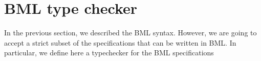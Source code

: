 \section{BML type checker}
In the previous section, we described the BML syntax.
However, we are going to accept a strict subset of 
the specifications that can be written in BML.
In particular, we define here a typechecker for the BML specifications 

     
